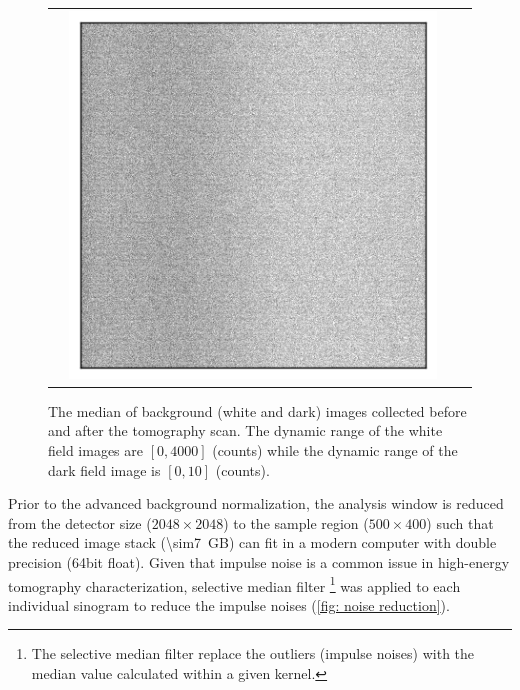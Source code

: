 \documentclass[12pt]{scrartcl}
\newcommand{\myscale}{1}
\begin{document}
\begin{figure}[htp]
\begin{tabular}{cccc}
& \includegraphics[scale=\myscale]{darkField_pst}
\end{tabular}
\caption{
The median of background (white and dark) images collected before and after the tomography scan.
The dynamic range of the white field images are $[0,4000]$ (counts) while the dynamic range of the dark field image is $[0,10]$ (counts).
}\label{fig: flat field images}
\end{figure}

Prior to the advanced background normalization, the analysis window is reduced from the detector size ($2048\times2048$) to the sample region ($500\times400$) such that the reduced image stack (\SI{\sim7}{GB}) can fit in a modern computer with double precision (64bit float).
Given that impulse noise is a common issue in high-energy tomography characterization, selective median filter%
\footnote{
The selective median filter replace the outliers (impulse noises) with the median value calculated within a given kernel.
} 
was applied to each individual sinogram to reduce the impulse noises (\cref{fig: noise reduction}).
\end{document}
